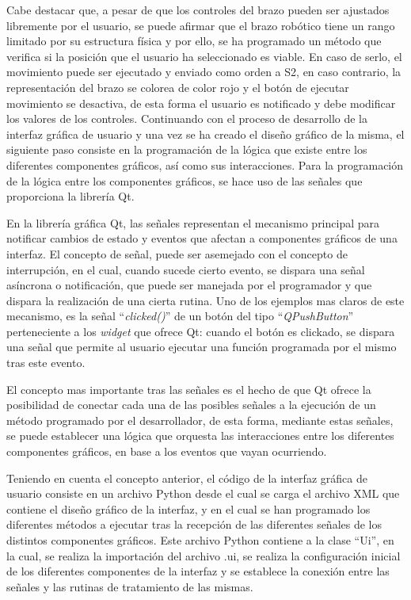 Cabe destacar que, a pesar de que los controles del brazo pueden ser ajustados libremente por el usuario, se puede afirmar que el brazo robótico tiene un rango limitado por su estructura física y por ello, se ha programado un método que verifica si la posición que el usuario ha seleccionado es viable. En caso de serlo, el movimiento puede ser ejecutado y enviado como orden a \ac{S2}, en caso contrario, la representación del brazo se colorea de color rojo y el botón de ejecutar movimiento se desactiva, de esta forma el usuario es notificado y debe modificar los valores de los controles.    
Continuando con el proceso de desarrollo de la interfaz gráfica de usuario y una vez se ha creado el diseño gráfico de la misma, el siguiente paso consiste en la programación de la lógica que existe entre los diferentes componentes gráficos, así como sus interacciones. Para la programación de la lógica entre los componentes gráficos, se hace uso de las señales que proporciona la librería Qt.

En la librería gráfica Qt, las señales representan el mecanismo principal para notificar cambios de estado y eventos que afectan a componentes gráficos de una interfaz. El concepto de señal, puede ser asemejado con el concepto de interrupción, en el cual, cuando sucede cierto evento, se dispara una señal asíncrona o notificación, que puede ser manejada por el programador y que dispara la realización de una cierta rutina. Uno de los ejemplos mas claros de este mecanismo, es la señal ``\textit{clicked()}'' de un botón del tipo ``\textit{QPushButton}'' perteneciente a los \textit{widget} que ofrece Qt: cuando el botón es clickado, se dispara una señal que permite al usuario ejecutar una función programada por el mismo tras este evento. 

El concepto mas importante tras las señales es el hecho de que Qt ofrece la posibilidad de conectar cada una de las posibles señales a la ejecución de un método programado por el desarrollador, de esta forma, mediante estas señales, se puede establecer una lógica que orquesta las interacciones entre los diferentes componentes gráficos, en base a los eventos que vayan ocurriendo.

Teniendo en cuenta el concepto anterior, el código de la interfaz gráfica de usuario consiste en un archivo Python desde el cual se carga el archivo XML que contiene el diseño gráfico de la interfaz, y en el cual se han programado los diferentes métodos a ejecutar tras la recepción de las diferentes señales de los distintos componentes gráficos. Este archivo Python contiene a la clase ``Ui'', en la cual, se realiza la importación del archivo .ui, se realiza la configuración inicial de los diferentes componentes de la interfaz y se establece la conexión entre las señales y las rutinas de tratamiento de las mismas.

